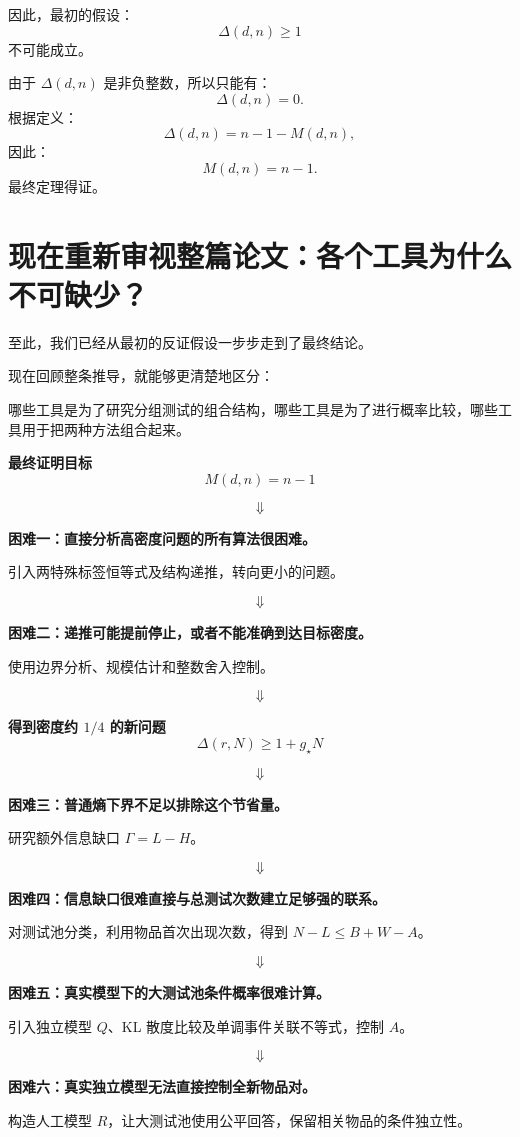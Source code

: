 \documentclass[UTF8,11pt]{ctexart}
\begin{document}
因此，最初的假设：
\[\Delta(d,n)\ge1\]
不可能成立。

由于 $\Delta(d,n)$ 是非负整数，所以只能有：
\[\Delta(d,n)=0.\]
根据定义：
\[\Delta(d,n)=n-1-M(d,n),\]
因此：
\[\boxed{M(d,n)=n-1.}\]
最终定理得证。

\section{现在重新审视整篇论文：各个工具为什么不可缺少？}
至此，我们已经从最初的反证假设一步步走到了最终结论。

现在回顾整条推导，就能够更清楚地区分：

哪些工具是为了研究分组测试的组合结构，哪些工具是为了进行概率比较，哪些工具用于把两种方法组合起来。

\begin{proofbox}\centering
\textbf{最终证明目标}
\[M(d,n)=n-1\]
\end{proofbox}
\[\Downarrow\]
\begin{proofbox}
\textbf{困难一：直接分析高密度问题的所有算法很困难。}

引入两特殊标签恒等式及结构递推，转向更小的问题。
\end{proofbox}
\[\Downarrow\]
\begin{proofbox}
\textbf{困难二：递推可能提前停止，或者不能准确到达目标密度。}

使用边界分析、规模估计和整数舍入控制。
\end{proofbox}
\[\Downarrow\]
\begin{proofbox}\centering
\textbf{得到密度约 $1/4$ 的新问题}
\[\Delta(r,N)\ge1+g_\star N\]
\end{proofbox}
\[\Downarrow\]
\begin{proofbox}
\textbf{困难三：普通熵下界不足以排除这个节省量。}

研究额外信息缺口 $\Gamma=L-H$。
\end{proofbox}
\[\Downarrow\]
\begin{proofbox}
\textbf{困难四：信息缺口很难直接与总测试次数建立足够强的联系。}

对测试池分类，利用物品首次出现次数，得到 $N-L\le B+W-A$。
\end{proofbox}
\[\Downarrow\]
\begin{proofbox}
\textbf{困难五：真实模型下的大测试池条件概率很难计算。}

引入独立模型 $Q$、KL 散度比较及单调事件关联不等式，控制 $A$。
\end{proofbox}
\[\Downarrow\]
\begin{proofbox}
\textbf{困难六：真实独立模型无法直接控制全新物品对。}

构造人工模型 $R$，让大测试池使用公平回答，保留相关物品的条件独立性。
\end{proofbox}
\end{document}
